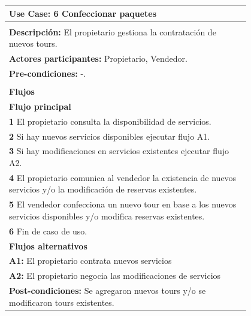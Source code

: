 \documentclass[12pt,a4paper,titlepage,oneside]{article}
\begin{document}
\begin{tabular}{| l | p{0.8\linewidth} |} \hline
	\multicolumn{2}{|p{0.8\linewidth}|}{\textbf{Use Case:} 6 Confeccionar paquetes} \\ \hline
	\multicolumn{2}{|c|}{} \\ \hline
	\multicolumn{2}{|p{0.8\linewidth}|}{\textbf{Descripci\'on:} El propietario gestiona la contratación de nuevos tours.} \\ \hline
	\multicolumn{2}{|p{0.8\linewidth}|}{\textbf{Actores participantes:} Propietario, Vendedor.} \\ \hline
	\multicolumn{2}{|p{0.8\linewidth}|}{\textbf{Pre-condiciones:} -.} \\ \hline
	\multicolumn{2}{|c|}{} \\ \hline
	\multicolumn{2}{|p{0.8\linewidth}|}{\textbf{Flujos}} \\ \hline
	\multicolumn{2}{|p{0.8\linewidth}|}{\textbf{Flujo principal}} \\ \hline
	\multicolumn{2}{|p{0.8\linewidth}|}{\textbf{1} El propietario consulta la disponibilidad de servicios.} \\ \hline
	\multicolumn{2}{|p{0.8\linewidth}|}{\textbf{2} Si hay nuevos servicios disponibles ejecutar flujo A1.} \\ \hline
	\multicolumn{2}{|p{0.8\linewidth}|}{\textbf{3} Si hay modificaciones en servicios existentes ejecutar flujo A2.} \\ \hline
	\multicolumn{2}{|p{0.8\linewidth}|}{\textbf{4} El propietario comunica al vendedor la existencia de nuevos servicios y/o la modificación de reservas existentes.} \\ \hline
		\multicolumn{2}{|p{0.8\linewidth}|}{\textbf{5} El vendedor confecciona un nuevo tour en base a los nuevos servicios disponibles y/o modifica reservas existentes.} \\ \hline
		\multicolumn{2}{|p{0.8\linewidth}|}{\textbf{6} Fin de caso de uso.} \\ \hline
			\multicolumn{2}{|p{0.8\linewidth}|}{\textbf{Flujos alternativos}	}\\ 			     \hline
	\multicolumn{2}{|p{0.8\linewidth}|}{\textbf{A1:} El propietario contrata nuevos servicios} \\ \hline
		\multicolumn{2}{|p{0.8\linewidth}|}{\textbf{A2:} El propietario negocia las modificaciones de servicios} \\ \hline
	\multicolumn{2}{|p{0.8\linewidth}|}{\textbf{Post-condiciones:} Se agregaron nuevos tours y/o se modificaron tours existentes.}\\ \hline
\end{tabular} \\\\
 \\\\
\end{document}
